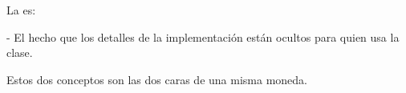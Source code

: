 La  es:

- El hecho que los detalles de la implementación están ocultos para quien usa la clase.

\vfill

Estos dos conceptos son las dos caras de una misma moneda.



\begin{center}





\end{center}
